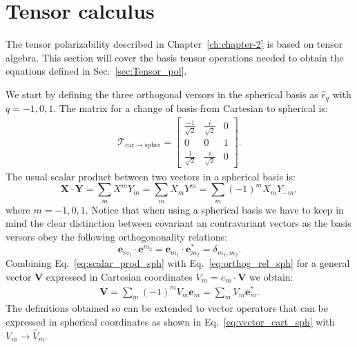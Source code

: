 \chapter{Tensor calculus}
\label{app:Tensors}

The tensor polarizability described in Chapter~\ref{ch:chapter-2} is based on tensor algebra. This section will cover the basis tensor operations needed to obtain the equations defined in Sec.~\ref{sec:Tensor_pol}.

We start by defining the three orthogonal versors in the spherical basis as $\hat{e}_{q}$ with $q=-1,0,1$.
The matrix for a change of basis from Cartesian to spherical is:
\begin{align}
	\mathcal{T}_{\mathrm{car\rightarrow spher}} =  \left[\begin{matrix}
		\frac{-1}{\sqrt2}& \frac{i}{\sqrt2}& 0 \\
		0&0&1\\
		\frac{1}{\sqrt2}& \frac{i}{\sqrt2}& 0
	\end{matrix} \right].
\end{align}
The usual scalar product between two vectors in a spherical basis is:
\begin{equation}
	\mathbf{X}\cdot\mathbf{Y} = \sum\limits_{m}X^mY_m= \sum\limits_{m}X_mY^m=\sum\limits_{m}\left(-1\right)^mX_mY_{-m},%
	\label{eq:scalar_prod_sph}
\end{equation}
where $m=-1,0,1$. Notice that when using a spherical basis we have to keep in mind the clear distinction between covariant an contravariant vectors as the basis versors obey the following orthogononality relations:
\begin{equation}
	\mathbf{e}_{m_1}\cdot\mathbf{e}^{m_2} = \mathbf{e}_{m_1}\cdot\mathbf{e}_{m_2}^*= \delta_{m_1,m_2}.
	\label{eq:orthog_rel_sph}
\end{equation}
Combining Eq.~\eqref{eq:scalar_prod_sph} with Eq.~\eqref{eq:orthog_rel_sph} for a general vector $\mathbf{V}$ expressed in Cartesian coordinates $V_m=\hat{e}_m\cdot\mathbf{V}$ we obtain:
\begin{align}
	\mathbf{V}=\sum\limits_m \left(-1\right)^mV_m\mathbf{e}_m=\sum\limits_mV_m\mathbf{e}^*_m.
	\label{eq:vector_cart_sph}
\end{align}
The definitions obtained so can be extended to vector operators that can be expressed in spherical coordinates as shown in Eq.~\eqref{eq:vector_cart_sph} with $V_m \rightarrow \hat{V}_m$.
